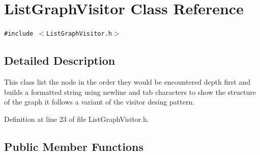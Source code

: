 \section{ListGraphVisitor Class Reference}
\label{classListGraphVisitor}
{\tt \#include $<$ListGraphVisitor.h$>$}



\subsection{Detailed Description}
This class list the node in the order they would be encountered depth first and builds a formatted string using newline and tab characters to show the structure of the graph it follows a variant of the visitor desing pattern. 

Definition at line 23 of file ListGraphVisitor.h.\subsection*{Public Member Functions}
